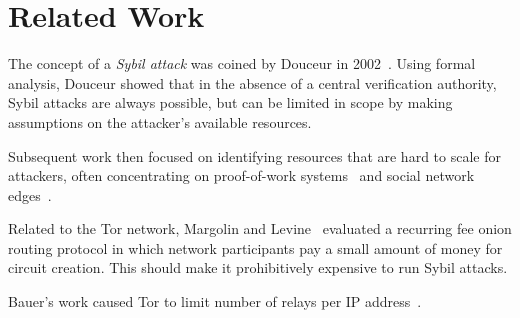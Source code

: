 \section{Related Work}
\label{sec:related_work}
The concept of a \emph{Sybil attack} was coined by Douceur in
2002~\cite{Douceur2002a}.  Using formal analysis, Douceur showed that in the
absence of a central verification authority, Sybil attacks are always possible,
but can be limited in scope by making assumptions on the attacker's available
resources.

Subsequent work then focused on identifying resources that are hard to scale for
attackers, often concentrating on proof-of-work
systems~\cite{Li2012a,Borisov2006a} and social network
edges~\cite{Danezis2009a,Yu2006a}.

\cite{Wolchok2010a}

Related to the Tor network, Margolin and Levine~\cite{Margolin2008a} evaluated
a recurring fee onion routing protocol in which network participants pay a
small amount of money for circuit creation.  This should make it prohibitively
expensive to run Sybil attacks.

Bauer's work caused Tor to limit number of relays per IP
address~\cite{Bauer2007a}.
